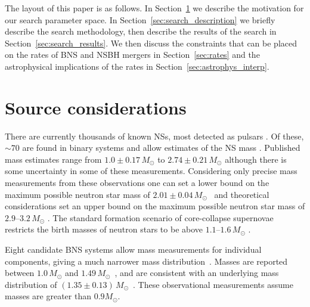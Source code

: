 The layout of this paper is as follows. In Section~\ref{sec:source_considerations} we describe
the motivation for our search parameter space. In Section~\ref{sec:search_description} we briefly
describe the search methodology, then describe the results of the search in Section~\ref{sec:search_results}.
We then discuss the constraints that can be placed on the rates of \ac{BNS} and \ac{NSBH} mergers in Section~\ref{sec:rates}
and the astrophysical implications of the rates in Section~\ref{sec:astrophys_interp}.

\section{Source considerations}
\label{sec:source_considerations}

There are currently thousands of known NSs, most detected as pulsars
\citep{pulsarcat,Manchester:2004bp}. Of these, $\sim70$ are found in binary
systems and allow estimates of the NS mass
\citep{nsmassespage,Lattimer:2012nd,Ozel:2016oaf}.
Published mass estimates range from $1.0\pm0.17\,{M_{\odot}}$ \citep{Falanga:2015mra} to
$2.74\pm0.21\,{{M_{\odot}}}$ \citep{Freire:2007jd} although there is some uncertainty
in some of these measurements.
Considering only precise mass measurements from these observations one can set a lower bound
on the maximum possible neutron star mass of $2.01\pm 0.04\,{M_{\odot}}$~\citep{Antoniadis:2013pzd} and theoretical considerations
set an upper bound on the maximum possible neutron star mass of $2.9$--$3.2\,{M_{\odot}}$ \citep{Rhoades:1974fn,Kalogera:1996ci}.
The standard formation scenario of core-collapse supernovae restricts the birth
masses of neutron stars to be above $1.1$--$1.6\,{M_{\odot}}$
\citep{Ozel:2012ax,Lattimer:2012nd,Kiziltan:2013oja}.

Eight candidate \ac{BNS} systems allow mass measurements for individual
components, giving a much narrower mass distribution~\citep{Lorimer:2008se}. Masses are
reported between $1.0\,{{M_{\odot}}}$ and
$1.49\,{{M_{\odot}}}$~\citep{nsmassespage,Ozel:2016oaf}, and are consistent with an
underlying mass distribution of $(1.35 \pm
0.13)\,{{M_{\odot}}}$~\citep{Kiziltan:2010ct}.
These observational measurements assume masses are greater than $0.9{{M_{\odot}}}$.

